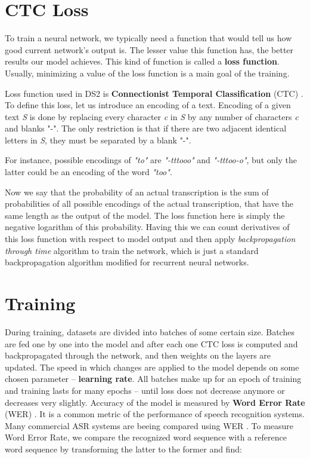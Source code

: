 \documentclass[licencjacka,en]{pracamgr}
\begin{document}
	\section{CTC Loss} \label{sec:ctc}
	To train a neural network, we typically need a function that would tell us how good current network's output is. The lesser value this function has, the better results our model achieves. This kind of function is called a \textbf{loss function}. Usually, minimizing a value of the loss function is a main goal of the training.
	
	Loss function used in DS2 is \textbf{Connectionist Temporal Classification} (CTC) \cite{DS3}. To define this loss, let us introduce an encoding of a text. Encoding of a given text \textit{S} is done by replacing every character \textit{c} in \textit{S} by any number of characters \textit{c} and blanks "-". The only restriction is that if there are two adjacent identical letters in \textit{S}, they must be separated by a blank "-".
	
	For instance, possible encodings of \textit{"to"} are \textit{"-tttooo"} and \textit{"-tttoo-o"}, but only the latter could be an encoding of the word \textit{"too"}.
	
	Now we say that the probability of an actual transcription is the sum of probabilities of all possible encodings of the actual transcription, that have the same length as the output of the model. The loss function here is simply the negative logarithm of this probability. Having this we can count derivatives of this loss function with respect to model output and then apply \textit{backpropagation through time} algorithm to train the network, which is just a standard backpropagation algorithm modified for recurrent neural networks.
	
	\section{Training} \label{sec:trainig}
	During training, datasets are divided into batches of some certain size. Batches are fed one by one into the model and after each one CTC loss is computed and backpropagated through the network, and then weights on the layers are updated. The speed in which changes are applied to the model depends on some chosen parameter -- \textbf{learning rate}. All batches make up for an epoch of training and training lasts for many epochs -- until loss does not decrease anymore or decreases very slightly.
	Accuracy of the model is measured by \textbf{Word Error Rate} (WER) \cite{DS1}. It is a common metric of the performance of speech recognition systems. Many commercial ASR systems are beeing compared using WER \cite{DS8}. To measure Word Error Rate, we compare the recognized word sequence with a reference word sequence by transforming the latter to the former and find:
	
\end{document}
